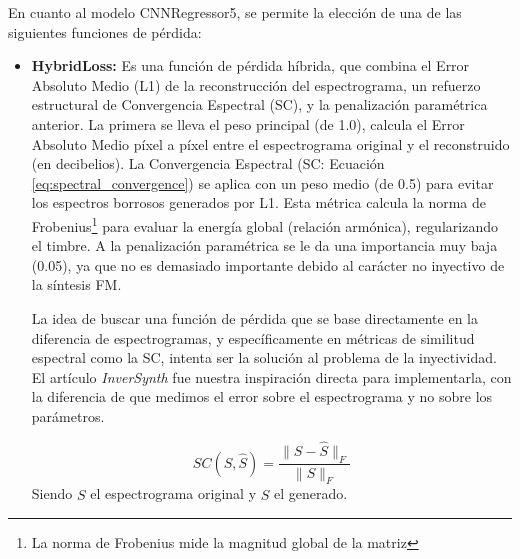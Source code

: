 En cuanto al modelo CNNRegressor5, se permite la elección de una de las siguientes funciones de pérdida:
\begin{itemize}
    \item \textbf{HybridLoss: }
    Es una función de pérdida híbrida, que combina el Error Absoluto Medio (L1) de la reconstrucción del 
    espectrograma, un refuerzo estructural de Convergencia Espectral (SC), y la penalización paramétrica anterior.
    La primera se lleva el peso principal (de 1.0), calcula el Error Absoluto Medio píxel a píxel entre el espectrograma original y el reconstruido (en decibelios).
    La Convergencia Espectral (SC: Ecuación \ref{eq:spectral_convergence}) se aplica con un peso medio (de 0.5) para evitar los espectros borrosos generados por L1. Esta métrica calcula la norma de Frobenius\footnote{La norma de Frobenius mide la magnitud global de la matriz}
    para evaluar la energía global (relación armónica), regularizando el timbre. A la penalización paramétrica se le da una importancia muy baja (0.05), ya que no es demasiado importante
    debido al carácter no inyectivo de la síntesis FM.

    La idea de buscar una función de pérdida que se base directamente en la diferencia de espectrogramas, y específicamente en métricas de similitud espectral como la SC, intenta ser la solución al problema de la inyectividad. El artículo \textit{InverSynth} \citep{barkan2019} fue nuestra inspiración directa para implementarla, con la diferencia de que medimos el error sobre el espectrograma y no sobre los parámetros.
    
    \begin{equation}
        \label{eq:spectral_convergence}
        SC(S, \hat{S}) = \frac{\lVert S - \hat{S} \rVert_F}{\lVert S \rVert_F}
    \end{equation}
    Siendo $S$ el espectrograma original y $\hat{S}$ el generado.


\end{itemize}
